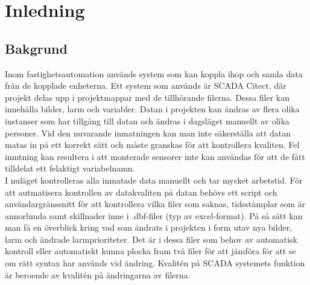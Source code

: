 \section{Inledning}



\subsection{Bakgrund}


Inom fastighetsautomation används system som kan koppla ihop och samla data från de kopplade enheterna. Ett system som används är SCADA Citect, där projekt delas upp i projektmappar med de tillhörande filerna. Dessa filer kan innehålla bilder, larm och variabler. Datan i projekten kan ändras av flera olika instanser som har tillgång till datan och ändras i dagsläget manuellt av olika personer. Vid den nuvarande inmatningen kan man inte säkerställa att datan matas in på ett korrekt sätt och måste granskas för att kontrollera kvaliten. Fel inmtning kan resultera i att monterade sensorer inte kan användas för att de fått tilldelat ett felaktigt variabelnamn. 
\\[5mm]

I nuläget kontrolleras alla inmatade data manuellt och tar mycket arbetstid. För att autmatisera kontrollen av datakvaliten på datan behövs ett script och användargränssnitt för att kontrollera vilka filer som saknas, tidsstämplar som är annorlunda samt skillnader inne i .dbf-filer (typ av excel-format). På så sätt kan man få en överblick kring vad som ändrats i projekten i form utav nya bilder, larm och ändrade larmprioriteter. Det är i dessa filer som behov av automatisk kontroll eller automatiskt kunna plocka fram två filer för att jämföra för att se om rätt syntax har används vid ändring. Kvalitén på SCADA systemets funktion är beroende av kvalitén på ändringarna av filerna.




